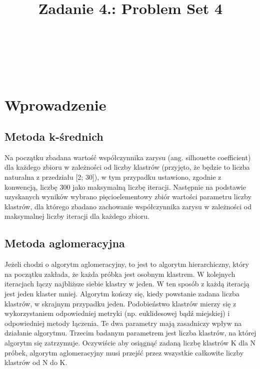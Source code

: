 \documentclass{classrep}
\author{%
    \studentinfo[239661@edu.p.lodz.pl]{Szymon Gruda}{239661}\\
    \studentinfo[239671@edu.p.lodz.pl]{Jan Karwowski}{239671}\\
    \studentinfo[239673@edu.p.lodz.pl]{Michał Kidawa}{239673}\\
    \studentinfo[239676@edu.p.lodz.pl]{Kamil Kowalewski}{239676}\\
}
\title{Zadanie 4.: Problem Set 4}
\begin{document}
    \maketitle
    \thispagestyle{fancyplain}

    \newpage
    \tableofcontents
    \newpage

    \section{Wprowadzenie}
    \label{intro} {

        \subsection{Metoda k-średnich}
        \label{kmeans_description} {
            Na początku zbadana wartość współczynnika zarysu (ang. silhouette
            coefficient) dla każdego zbioru w zależności od liczby klastrów (przyjęto,
            że będzie to liczba naturalna z przedziału [2; 30]), w tym przypadku
            ustawiono, zgodnie z konwencją, liczbę 300 jako maksymalną liczbę iteracji.
            Następnie na podstawie uzyskanych wyników wybrano pięcioelementowy zbiór
            wartości parametru liczby klastrów, dla którego zbadano zachowanie
            współczynnika zarysu w zależności od maksymalnej liczby iteracji dla
            każdego zbioru.
        }
        
        \subsection{Metoda aglomeracyjna}
        \label{agglomerative_description} {
            Jeżeli chodzi o algorytm aglomeracyjny, to jest to algorytm hierarchiczny, który na początku zakłada, że każda próbka jest osobnym klastrem. W kolejnych iteracjach łączy najbliższe siebie klastry w jeden. W ten sposób z każdą iteracją jest jeden klaster mniej. Algorytm kończy się, kiedy powstanie zadana liczba klastrów, w skrajnym przypadku jeden. Podobieństwo klastrów mierzy się z wykorzystaniem odpowiedniej metryki (np. euklidesowej bądź miejskiej) i odpowiedniej metody łączenia. Te dwa parametry mają zasadniczy wpływ na działanie algorytmu. Trzecim badanym parametrem jest liczba klastrów, na której algorytm się zatrzymuje. Oczywiście aby osiągnąć zadaną liczbę klastrów K dla N próbek, algorytm aglomeracyjny musi przejść przez wszystkie całkowite liczby klastrów od N do K.
        }

}
\end{document}
